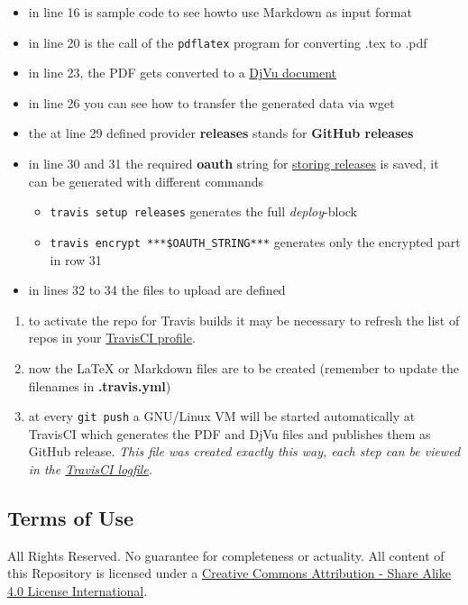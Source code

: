 \documentclass[]{article}
\providecommand{\tightlist}{
  \setlength{\itemsep}{0pt}\setlength{\parskip}{0pt}}
\begin{document}
\begin{itemize}
\tightlist
\item
  in line 16 is sample code to see howto use Markdown as input format
\item
  in line 20 is the call of the \texttt{pdflatex} program for converting
  .tex to .pdf
\item
  in line 23, the PDF gets converted to a
  \href{https://de.wikipedia.org/wiki/DjVu}{DjVu document}
\item
  in line 26 you can see how to transfer the generated data via wget
\item
  the at line 29 defined provider \textbf{releases} stands for
  \textbf{GitHub releases}
\item
  in line 30 and 31 the required \textbf{oauth} string for
  \href{http://docs.travis-ci.com/user/deployment/releases/}{storing
  releases} is saved, it can be generated with different commands

  \begin{itemize}
  \tightlist
  \item
    \texttt{travis\ setup\ releases} generates the full
    \emph{deploy}-block
  \item
    \texttt{travis\ encrypt\ ***\$OAUTH\_STRING***} generates only the
    encrypted part in row 31
  \end{itemize}
\item
  in lines 32 to 34 the files to upload are defined
\end{itemize}

\begin{enumerate}
\def\labelenumi{\arabic{enumi}.}
\tightlist
\item
  to activate the repo for Travis builds it may be necessary to refresh
  the list of repos in your
  \href{https://travis-ci.org/profile}{TravisCI profile}.
\item
  now the LaTeX or Markdown files are to be created (remember to update
  the filenames in \textbf{.travis.yml})
\item
  at every \texttt{git\ push} a GNU/Linux VM will be started
  automatically at TravisCI which generates the PDF and DjVu files and
  publishes them as GitHub release. \emph{This file was created exactly
  this way, each step can be viewed in the
  \href{https://travis-ci.org/SimonWaldherr/testrepo}{TravisCI
  logfile}.}
\end{enumerate}

\subsection{Terms of Use}\label{terms-of-use}

All Rights Reserved. No guarantee for completeness or actuality. All
content of this Repository is licensed under a
\href{http://creativecommons.org/licenses/by-sa/4.0/}{Creative Commons
Attribution - Share Alike 4.0 License International}.
\end{document}

